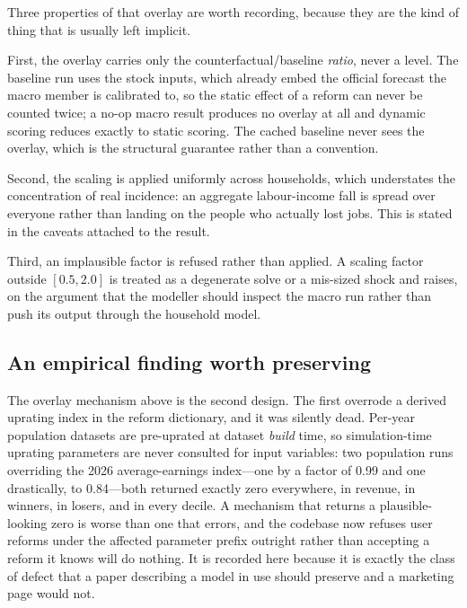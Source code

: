 Three properties of that overlay are worth recording, because they are the kind of thing that is usually left implicit.

First, the overlay carries only the counterfactual/baseline \emph{ratio}, never a level. The baseline run uses the stock inputs, which already embed the official forecast the macro member is calibrated to, so the static effect of a reform can never be counted twice; a no-op macro result produces no overlay at all and dynamic scoring reduces exactly to static scoring. The cached baseline never sees the overlay, which is the structural guarantee rather than a convention.

Second, the scaling is applied uniformly across households, which understates the concentration of real incidence: an aggregate labour-income fall is spread over everyone rather than landing on the people who actually lost jobs. This is stated in the caveats attached to the result.

Third, an implausible factor is refused rather than applied. A scaling factor outside $[0.5, 2.0]$ is treated as a degenerate solve or a mis-sized shock and raises, on the argument that the modeller should inspect the macro run rather than push its output through the household model.

\subsection{An empirical finding worth preserving}

The overlay mechanism above is the second design. The first overrode a derived uprating index in the reform dictionary, and it was silently dead. Per-year population datasets are pre-uprated at dataset \emph{build} time, so simulation-time uprating parameters are never consulted for input variables: two population runs overriding the 2026 average-earnings index---one by a factor of 0.99 and one drastically, to 0.84---both returned exactly zero everywhere, in revenue, in winners, in losers, and in every decile. A mechanism that returns a plausible-looking zero is worse than one that errors, and the codebase now refuses user reforms under the affected parameter prefix outright rather than accepting a reform it knows will do nothing. It is recorded here because it is exactly the class of defect that a paper describing a model in use should preserve and a marketing page would not.

